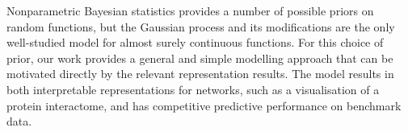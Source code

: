 Nonparametric Bayesian statistics provides a number of possible priors on random functions, but the Gaussian process
and its modifications are the only well-studied model for almost surely continuous functions.
For this choice of prior, our work provides a general and simple modelling approach that can be motivated directly by the
relevant representation results.
The model results in both interpretable representations for networks, such as a visualisation of a protein interactome, and has 
competitive predictive performance on benchmark data.



\outbpdocument{


}
